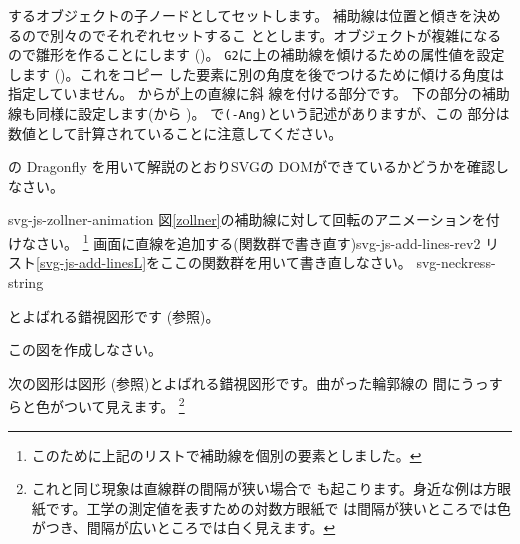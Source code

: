 {{ するオブジェクトの子ノードとしてセットします。}
{補助線は位置と傾きを決めるので別々のでそれぞれセットするこ
       ととします。オブジェクトが複雑になるので雛形を作ることにします
       ()。
}
{\texttt{G2}に上の補助線を傾けるための属性値を設定します
       ()。これをコピー
       した要素に別の角度を後でつけるために傾ける角度は指定していません。}
{からが上の直線に斜
       線を付ける部分です。
}
{下の部分の補助線も同様に設定します(から
       )。}
{で\texttt{(-Ang)}という記述がありますが、この
       部分は数値として計算されていることに注意してください。} 
}
\begin{Problem}\upshape
 \Opera の Dragonfly を用いて解説のとおりSVGの
 DOMができているかどうかを確認しなさい。
\end{Problem}
{svg-js-zollner-animation}
{図\ref{zollner}の補助線に対して回転のアニメーションを付けなさい。
\footnote{このために上記のリストで補助線を個別の要素としました。}}
%
{画面に直線を追加する(関数群で書き直す)}{svg-js-add-lines-rev2}
{リスト\ref{svg-js-add-linesL}をここの関数群を用いて書き直しなさい。}
{svg-neckress-string}
{とよばれる錯視図形です
 (\cite[60ページ図6.6右]{Ninio}参照)。\par
この図を作成しなさい。}
次の図形は図形
(\cite[カラー図版 9]{Ninio}参照)とよばれる錯視図形です。曲がった輪郭線の
間にうっすらと色がついて見えます。
\footnote{これと同じ現象は直線群の間隔が狭い場合で
も起こります。身近な例は方眼紙です。工学の測定値を表すための対数方眼紙で
は間隔が狭いところでは色がつき、間隔が広いところでは白く見えます。}
